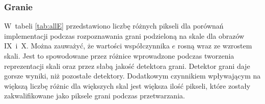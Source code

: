 \subsubsection{Granie}
\label{subsubsec:granieTabele}

W~tabeli \ref{tab:allE} przedstawiono liczbę różnych pikseli dla porównań implementacji podczas rozpoznawania grani podzieloną na skale dla obrazów IX~i~X. Można zauważyć, że wartości współczynnika $ e $ rosną wraz ze wzrostem skali. Jest to spowodowane przez różnice wprowadzone podczas tworzenia reprezentacji skali oraz przez słabą jakość detektora grani. Detektor grani daje gorsze wyniki, niż pozostałe detektory. Dodatkowym czynnikiem wpływającym na większą liczbę różnic dla większych skal jest większa ilość pikseli, które zostały zakwalifikowane jako piksele grani podczas przetwarzania.
